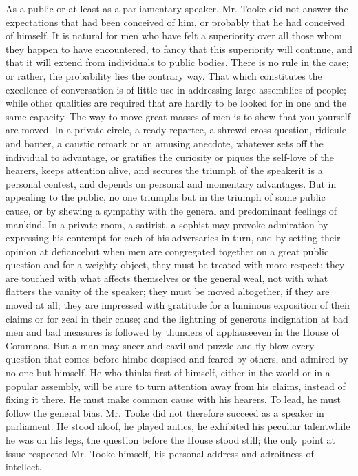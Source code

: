 As a public or at least as a parliamentary speaker, Mr. Tooke did
not answer the expectations that had been conceived of him, or
probably that he had conceived of himself. It is natural for men
who have felt a superiority over all those whom they happen to
have encountered, to fancy that this superiority will continue,
and that it will extend from individuals to public bodies. There
is no rule in the case; or rather, the probability lies the
contrary way. That which constitutes the excellence of
conversation is of little use in addressing large assemblies of
people; while other qualities are required that are hardly to be
looked for in one and the same capacity. The way to move great
masses of men is to shew that you yourself are moved. In a private
circle, a ready repartee, a shrewd cross-question, ridicule and
banter, a caustic remark or an amusing anecdote, whatever sets off
the individual to advantage, or gratifies the curiosity or piques
the self-love of the hearers, keeps attention alive, and secures
the triumph of the speaker\textemdash it is a personal contest, and depends
on personal and momentary advantages. But in appealing to the
public, no one triumphs but in the triumph of some public cause,
or by shewing a sympathy with the general and predominant feelings
of mankind. In a private room, a satirist, a sophist may provoke
admiration by expressing his contempt for each of his adversaries
in turn, and by setting their opinion at defiance\textemdash but when men
are congregated together on a great public question and for a
weighty object, they must be treated with more respect; they are
touched with what affects themselves or the general weal, not with
what flatters the vanity of the speaker; they must be moved
altogether, if they are moved at all; they are impressed with
gratitude for a luminous exposition of their claims or for zeal in
their cause; and the lightning of generous indignation at bad men
and bad measures is followed by thunders of applause\textemdash even in the
House of Commons. But a man may sneer and cavil and puzzle and
fly-blow every question that comes before him\textemdash be despised and
feared by others, and admired by no one but himself. He who thinks
first of himself, either in the world or in a popular assembly,
will be sure to turn attention away from his claims, instead of
fixing it there. He must make common cause with his hearers. To
lead, he must follow the general bias. Mr. Tooke did not therefore
succeed as a speaker in parliament. He stood aloof, he played
antics, he exhibited his peculiar talent\textemdash while he was on his
legs, the question before the House stood still; the only point at
issue respected Mr. Tooke himself, his personal address and
adroitness of intellect.

